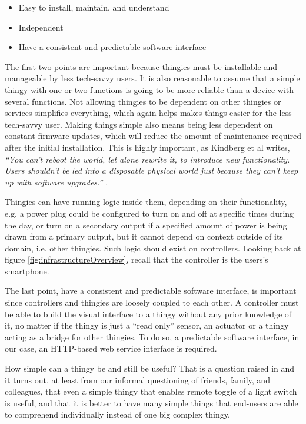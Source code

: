 \documentclass{ubicomp2012}
\begin{document}
\begin{itemize}
\item Easy to install, maintain, and understand
\item Independent
\item Have a consistent and predictable software interface
\end{itemize}

The first two points are important because thingies must be installable and manageable by less tech-savvy users. It is also reasonable to assume that a simple thingy with one or two functions is going to be more reliable than a device with several functions. Not allowing thingies to be dependent on other thingies or services simplifies everything, which again helps makes things easier for the less tech-savvy user. Making things simple also means being less dependent on constant firmware updates, which will reduce the amount of maintenance required after the initial installation. This is highly important, as Kindberg et al writes, \textit{ ``You can't reboot the world, let alone rewrite it, to introduce new functionality. Users shouldn't be led into a disposable physical world just because they can't keep up with software upgrades.''} \cite{kindbergSystem}.

Thingies can have running logic inside them, depending on their functionality, e.g. a power plug could be configured to turn on and off at specific times during the day, or turn on a secondary output if a specified amount of power is being drawn from a primary output, but it cannot depend on context outside of its domain, i.e. other thingies. Such logic should exist on controllers. Looking back at figure \ref{fig:infrastructureOverview}, recall that the controller is the users's smartphone.

The last point, have a consistent and predictable software interface, is important since controllers and thingies are loosely coupled to each other. A controller must be able to build the visual interface to a thingy without any prior knowledge of it, no matter if the thingy is just a ``read only'' sensor, an actuator or a thingy acting as a bridge for other thingies. To do so, a predictable software interface, in our case, an HTTP-based web service interface is required.

How simple can a thingy be and still be useful? That is a question raised in \cite{Edwards01athome} and it turns out, at least from our informal questioning of friends, family, and colleagues, that even a simple thingy that enables remote toggle of a light switch is useful, and that it is better to have many simple things that end-users are able to comprehend individually instead of one big complex thingy.
\end{document}
